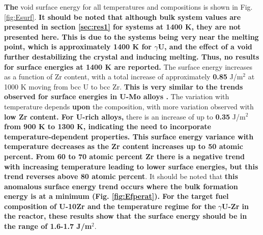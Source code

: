 \documentclass[review]{elsarticle}
\providecommand{\DIFaddtex}[1]{{\bf #1}} %
\providecommand{\DIFdeltex}[1]{} %
\providecommand{\DIFaddbegin}{\protect\color{blue}} %
\providecommand{\DIFaddend}{\protect\color{black}} %
\providecommand{\DIFdelbegin}{\protect\color{red}} %
\providecommand{\DIFdelend}{\protect\color{black}} %
\providecommand{\DIFadd}[1]{\texorpdfstring{\DIFaddtex{#1}}{#1}} %
\providecommand{\DIFdel}[1]{\texorpdfstring{\DIFdeltex{#1}}{}} %
\newcommand{\DIFscaledelfig}{0.5}
\newlength{\DIFdelgraphicswidth} %
\newlength{\DIFdelgraphicsheight} %
\newcommand{\DIFaddincludegraphics}[2][]{{\color{blue}\fbox{\DIFOincludegraphics[#1]{#2}}}} %
\newcommand{\DIFdelincludegraphics}[2][]{%
\sbox{\DIFdelgraphicsbox}{\DIFOincludegraphics[#1]{#2}}%
\settoboxwidth{\DIFdelgraphicswidth}{\DIFdelgraphicsbox} %
\settoboxtotalheight{\DIFdelgraphicsheight}{\DIFdelgraphicsbox} %
\scalebox{\DIFscaledelfig}{%
\parbox[b]{\DIFdelgraphicswidth}{\usebox{\DIFdelgraphicsbox}\\[-\baselineskip] \rule{\DIFdelgraphicswidth}{0em}}\llap{\resizebox{\DIFdelgraphicswidth}{\DIFdelgraphicsheight}{%
\setlength{\unitlength}{\DIFdelgraphicswidth}%
\begin{picture}(1,1)%
\thicklines\linethickness{2pt} %
{\color[rgb]{1,0,0}\put(0,0){\framebox(1,1){}}}%
{\color[rgb]{1,0,0}\put(0,0){\line( 1,1){1}}}%
{\color[rgb]{1,0,0}\put(0,1){\line(1,-1){1}}}%
\end{picture}%
}\hspace*{3pt}}} %
} %
\DeclareRobustCommand{\DIFaddbegin}{\DIFOaddbegin \let\includegraphics\DIFaddincludegraphics} %
\DeclareRobustCommand{\DIFaddend}{\DIFOaddend \let\includegraphics\DIFOincludegraphics} %
\DeclareRobustCommand{\DIFdelbegin}{\DIFOdelbegin \let\includegraphics\DIFdelincludegraphics} %
\DeclareRobustCommand{\DIFdelend}{\DIFOaddend \let\includegraphics\DIFOincludegraphics} %
\begin{document}
\DIFadd{The }\DIFaddend void surface energy for all temperatures and compositions is shown in Fig. \ref{fig:Esurf}. \DIFaddbegin \DIFadd{It should be noted that although bulk system values are presented in section \ref{sec:res1} for systems at 1400 K, they are not presented here. This is due to the systems being very near the melting point, which is approximately 1400 K for $\gamma$U, and the effect of a void further destabilizing the crystal and inducing melting. Thus, no results for surface energies at 1400 K are reported. }\DIFaddend The surface energy increases as a function of Zr content, with a total increase of approximately \DIFdelbegin \DIFdel{0.8 }\DIFdelend \DIFaddbegin \DIFadd{0.85 }\DIFaddend J/m$^2$ \DIFdelbegin \DIFdel{for $\gamma$U-Zr }\DIFdelend at 1000 K moving from bcc U to bcc Zr. \DIFaddbegin \DIFadd{This is very similar to the trends observed for surface energies in U-Mo alloys \cite{beelerumo}. }\DIFaddend The variation with temperature depends \DIFdelbegin \DIFdel{on }\DIFdelend \DIFaddbegin \DIFadd{upon }\DIFaddend the composition, with more variation observed with \DIFdelbegin \DIFdel{less Zr . There is no statistically significant difference in the surface energy as a function of temperature for compositions above 50 atomic percent Zr, but }\DIFdelend \DIFaddbegin \DIFadd{low Zr content. For U-rich alloys, }\DIFaddend there is an increase of up to \DIFdelbegin \DIFdel{0.2 }\DIFdelend \DIFaddbegin \DIFadd{0.35 }\DIFaddend J/m$^2$ \DIFdelbegin \DIFdel{for low Zr alloys. This is very similar to the trends observed for surface energiesin U-Mo alloys \cite{beelerumo}}\DIFdelend \DIFaddbegin \DIFadd{from 900 K to 1300 K, indicating the need to incorporate temperature-dependent properties. This surface energy variance with temperature decreases as the Zr content increases up to 50 atomic percent. From 60 to 70 atomic percent Zr there is a negative trend with increasing temperature leading to lower surface energies, but this trend reverses above 80 atomic percent}\DIFaddend . It should be noted that \DIFdelbegin \DIFdel{although bulk system values are presented in section \ref{sec:res1} for systems at 1400 K, they are not presented here. This is due to the systems being very near the melting point, which is approximately 1400 K for }\DIFdelend \DIFaddbegin \DIFadd{this anomalous surface energy trend occurs where the bulk formation energy is at a minimum (Fig. \ref{fig:Efperat}). For the target fuel composition of U-10Zr and the temperature regime for the }\DIFaddend $\gamma$\DIFdelbegin \DIFdel{U, and the effect of a void further destabilizing the crystal and inducing melting. Thus, no results for surface energies at 1400 K are reported}\DIFdelend \DIFaddbegin \DIFadd{U-Zr in the reactor, these results show that the surface energy should be in the range of 1.6-1.7 J/m$^2$}\DIFaddend .
\end{document}
